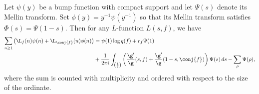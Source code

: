     \begin{theorem}
      Let $\psi(y)$ be a bump function with compact support and let $\Psi(s)$ denote its Mellin transform. Set $\phi(y) = y^{-1}\psi(y^{-1})$ so that its Mellin transform satisfies $\Phi(s) = \Psi(1-s)$. Then for any $L$-function $L(s,f)$, we have
      \begin{align*}
        \sum_{n \ge 1}\left(\L_{f}(n)\psi(n)+\L_{\conj{f}}(n)\phi(n)\right) &= \psi(1)\log{q(f)}+r_{f}\Psi(1) \\
        &+ \frac{1}{2\pi i}\int_{\left(\frac{1}{2}\right)}\left(\frac{\g'}{\g}(s,f)+\frac{\g'}{\g}(1-s,\conj{f})\right)\Psi(s)\,ds-\sum_{\rho}\Psi(\rho),
      \end{align*}
      where the sum is counted with multiplicity and ordered with respect to the size of the ordinate.
    \end{theorem}
